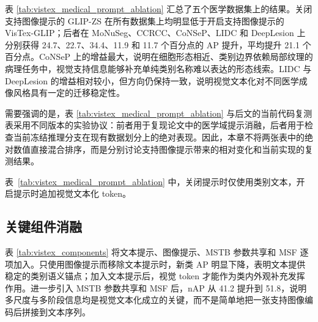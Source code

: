 表 \ref{tab:vistex_medical_prompt_ablation} 汇总了五个医学数据集上的结果。关闭支持图像提示的 GLIP-ZS 在所有数据集上均明显低于开启支持图像提示的 VisTex-GLIP；后者在 MoNuSeg、CCRCC、CoNSeP、LIDC 和 DeepLesion 上分别获得 24.7、22.7、34.4、11.9 和 11.7 个百分点的 AP 提升，平均提升 21.1 个百分点。CoNSeP 上的增益最大，说明在细胞形态相近、类别边界依赖局部纹理的病理任务中，视觉支持信息能够补充单纯类别名称难以表达的形态线索。LIDC 与 DeepLesion 的增益相对较小，但方向仍保持一致，说明视觉文本化对不同医学成像风格具有一定的迁移稳定性。

需要强调的是，表 \ref{tab:vistex_medical_prompt_ablation} 与后文的当前代码复测表采用不同版本的实验协议：前者用于复现论文中的医学域提示消融，后者用于检查当前冻结推理分支在现有数据划分上的绝对表现。因此，本章不将两张表中的绝对数值直接混合排序，而是分别讨论支持图像提示带来的相对变化和当前实现的复测结果。

\begin{table}[t]
  \centering
  \caption{医学域图像提示消融}
  \label{tab:vistex_medical_prompt_ablation}
\end{table}
表~\ref{tab:vistex_medical_prompt_ablation} 中，关闭提示时仅使用类别文本，开启提示时追加视觉文本化 token。


\subsection{关键组件消融}
表 \ref{tab:vistex_components} 将文本提示、图像提示、MSTB 参数共享和 MSF 逐项加入。只使用图像提示而移除文本提示时，新类 AP 明显下降，表明文本提供稳定的类别语义锚点；加入文本提示后，视觉 token 才能作为类内外观补充发挥作用。进一步引入 MSTB 参数共享和 MSF 后，nAP 从 41.2 提升到 51.8，说明多尺度与多阶段信息均是视觉文本化成立的关键，而不是简单地把一张支持图像编码后拼接到文本序列。

